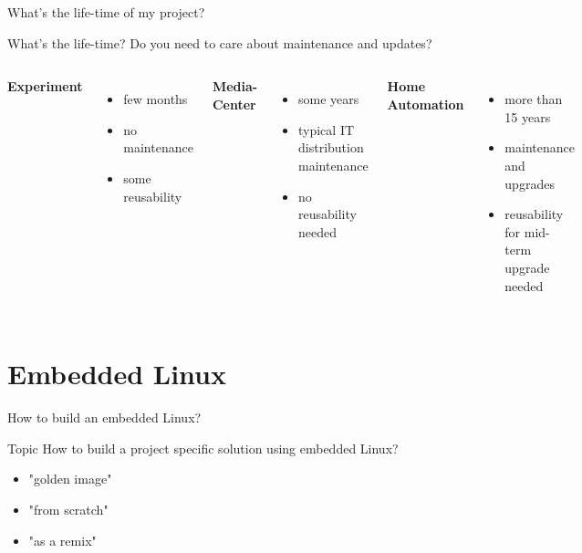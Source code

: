 \documentclass{beamer}
\begin{document}
\begin{frame}{What's the life-time of my project?}
	\begin{block}{What's the life-time?}
		Do you need to care about maintenance and updates?
	\end{block}

	\begin{columns}
        \centering
        \textbf{Experiment}
        \begin{itemize}
        		\item few months
        		\item no maintenance
        		\item some reusability
        \end{itemize}
        \centering
        \textbf{Media-Center}
        \begin{itemize}
        		\item some years
        		\item typical IT distribution maintenance
        		\item no reusability needed
        \end{itemize}
        \centering
        \textbf{Home Automation}
        \begin{itemize}
        		\item more than 15 years
        		\item maintenance and upgrades
        		\item reusability for mid-term upgrade needed
        \end{itemize}
    \end{columns}
\end{frame}

\section{Embedded Linux}

\begin{frame}{How to build an embedded Linux?}
	\begin{block}{Topic}
		How to build a project specific solution using embedded Linux?
	\end{block}

	\begin{itemize}
		\item "golden image"
		\item "from scratch"
		\item "as a remix"
	\end{itemize}
\end{frame}
\end{document}
